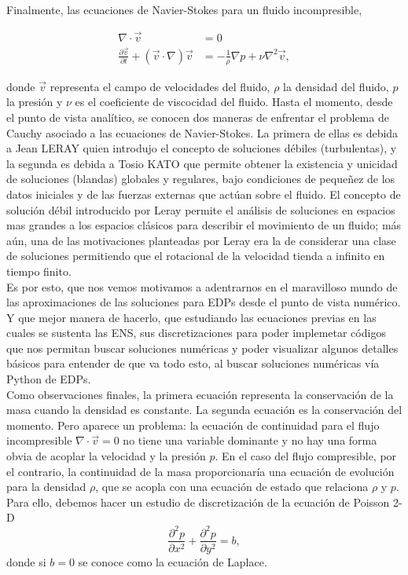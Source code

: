 \documentclass[A4,11pt]{article}
\begin{document}
\begin{multicols}{2}
Finalmente, las ecuaciones de Navier-Stokes para un fluido incompresible, 

\begin{equation}
	\label{edNavierStokes}
	\begin{split}
	\nabla \cdot\vec{v} &= 0 \\
	\frac{\partial \vec{v}}{\partial t}+(\vec{v}\cdot\nabla)\vec{v} &= -\frac{1}{\rho}\nabla p + \nu \nabla^2\vec{v},
	\end{split}
\end{equation}

donde $\vec{v}$ representa el campo de velocidades del fluido, $\rho$ la densidad del fluido, $p$ la presión y $\nu$ es el coeficiente de viscocidad del fluido. Hasta el momento, desde el punto de vista analítico, se conocen dos maneras de enfrentar el problema de Cauchy
asociado a las ecuaciones de Navier-Stokes. La primera de ellas es debida a
Jean LERAY \cite{leray} quien introdujo el concepto de soluciones débiles (turbulentas), y la segunda es debida a Tosio KATO \cite{kato} que permite obtener la existencia y unicidad de soluciones (blandas) globales y regulares, bajo condiciones
de pequeñez de los datos iniciales y de las fuerzas externas que actúan sobre
el fluido. El concepto de solución débil introducido por Leray permite el análisis
de soluciones en espacios mas grandes a los espacios clásicos para describir el
movimiento de un fluido; más aún, una de las motivaciones planteadas por Leray
era la de considerar una clase de soluciones permitiendo que el rotacional de la
velocidad tienda a infinito en tiempo finito.\\

Es por esto, que nos vemos motivamos a adentrarnos en el maravilloso mundo de las aproximaciones de las soluciones para EDPs desde el punto de vista numérico. Y que mejor manera de hacerlo, que estudiando las ecuaciones previas en las cuales se sustenta las ENS, sus discretizaciones para poder implemetar códigos que nos permitan buscar soluciones numéricas y poder visualizar algunos detalles básicos para entender de que va todo esto, al buscar soluciones numéricas vía Python de EDPs.\\

 Como observaciones finales, la primera ecuación representa la conservación de la masa cuando la densidad es constante. La segunda ecuación es la conservación del momento. Pero aparece un problema: la ecuación de continuidad para el flujo incompresible $ \nabla \cdot \vec{v} = 0 $ no tiene una variable dominante y no hay una forma obvia de acoplar la velocidad  y la presión $ p $. En el caso del flujo compresible, por el contrario, la continuidad de la masa proporcionaría una ecuación de evolución para la densidad $ \rho $, que se acopla con una ecuación de estado que relaciona $ \rho $ y $ p $. Para ello, debemos hacer un estudio de discretización de la ecuación de Poisson 2-D
$$\frac{\partial ^2 p}{\partial x^2} + \frac{\partial ^2 p}{\partial y^2} = b,$$
donde si $b=0$ se conoce como la ecuación de Laplace.


\end{multicols}
\end{document}
